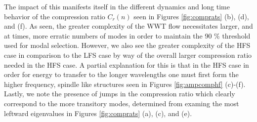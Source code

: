 \documentclass[aps,prl,preprint,groupedaddress]{revtex4-1}
\begin{document}
The impact of this manifests itself in the different dynamics and long time behavior of the compression ratio $C_{r}(n)$ seen in Figures \ref{fig:comprats} (b), (d), and (f).  As seen, the greater complexity of the WWT flow necessitates larger, and at times, more erratic numbers of modes in order to maintain the 90 \% threshold used for modal selection.  However, we also see the greater complexity of the HFS case in comparison to the LFS case by way of the overall larger compression ratio needed in the HFS case.  A partial explanation for this is that in the HFS case in order for energy to transfer to the longer wavelengths one must first form the higher frequency, spindle like structures seen in Figures \ref{fig:ampcomphf} (c)-(f).  Lastly, we note the presence of jumps in the compression ratio which clearly correspond to the more transitory modes, determined from examing the most leftward eigenvalues in Figures \ref{fig:comprats} (a), (c), and (e).
\end{document}
